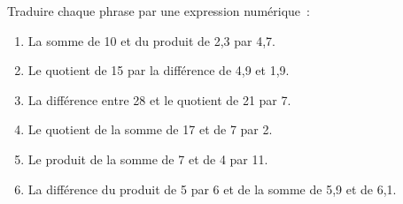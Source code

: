 \documentclass[exercice]{thedocument}%
\begin{document}
%
Traduire chaque phrase par une expression numérique~:\par\vskip10pt
\begin{enumerate}
    \item La somme de 10 et du produit de 2,3 par 4,7.
    \item Le quotient de 15 par la différence de 4,9 et 1,9.
    \item La différence entre 28 et le quotient de 21 par 7.
    \item Le quotient de la somme de 17 et de 7 par 2.
    \item Le produit de la somme de 7 et de 4 par 11.
    \item La différence du produit de 5 par 6 et de la somme de 5,9 et de 6,1.
\end{enumerate}
\end{document}
